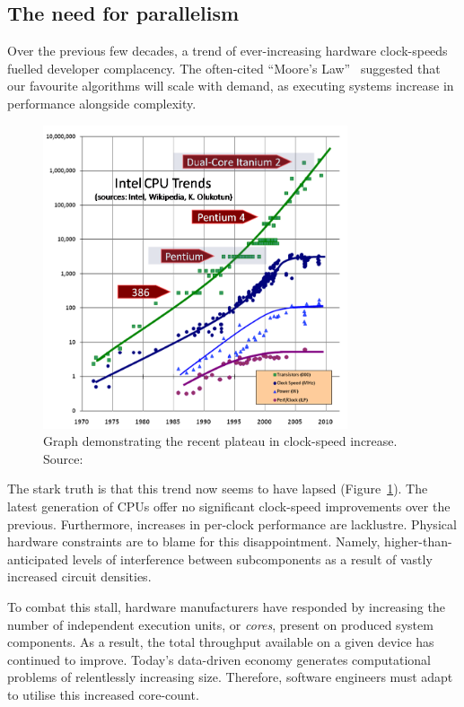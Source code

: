 \subsection{The need for parallelism}

Over the previous few decades, a trend of ever-increasing hardware clock-speeds fuelled developer complacency.
The often-cited ``Moore's Law''~\cite{moores_law} suggested that our favourite algorithms will scale with demand, as executing systems increase in performance alongside complexity.

\begin{figure}[h]
  \includegraphics[width=0.8\textwidth]{./figures/free_lunch_over.png}
  \caption{Graph demonstrating the recent plateau in clock-speed increase. Source:~\cite{free_lunch_over}}
  \label{fig:free_lunch_over}
\end{figure}

The stark truth is that this trend now seems to have lapsed (Figure~\ref{fig:free_lunch_over}).
The latest generation of \acp{CPU} offer no significant clock-speed improvements over the previous. Furthermore, increases in per-clock performance are lacklustre.
Physical hardware constraints are to blame for this disappointment. Namely, higher-than-anticipated levels of interference between subcomponents as a result of vastly increased circuit densities.

To combat this stall, hardware manufacturers have responded by increasing the number of independent execution units, or \emph{cores}, present on produced system components. As a result, the total throughput available on a given device has continued to improve.
Today's data-driven economy generates computational problems of relentlessly increasing size. Therefore, software engineers must adapt to utilise this increased core-count.

